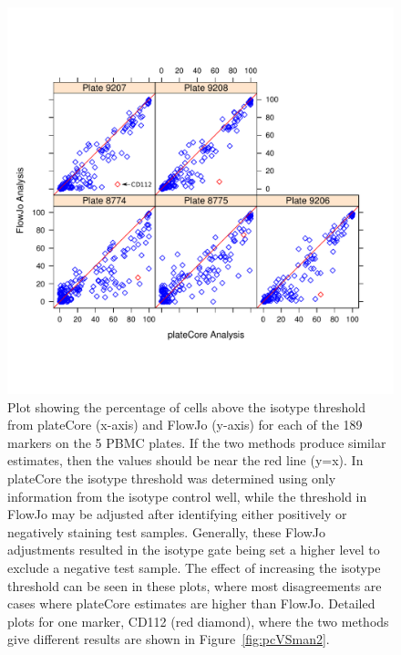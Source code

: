 \documentclass[12pt]{article}
\begin{document}
\begin{figure}
\centering
\includegraphics{fjVSr.pdf}
\caption{Plot showing the percentage of cells above the isotype threshold
from plateCore (x-axis) and FlowJo (y-axis) for each of the 189 markers on
the 5 PBMC plates. If the two methods produce similar estimates, then the
values should be near the red line (y=x). In plateCore the isotype threshold was
determined using only information from the isotype control well, while the
threshold in FlowJo may be adjusted after identifying either positively or
negatively staining test samples. Generally, these FlowJo adjustments resulted
in the isotype gate being set a higher level to exclude a negative test sample. 
The effect of increasing the isotype threshold can be seen in these plots,
where most disagreements are cases where plateCore estimates are higher than
FlowJo. Detailed plots for one marker, CD112 (red diamond), where the two
methods give different results are shown in Figure~\ref{fig:pcVSman2}.
}
\label{fig:pcVSman}
\end{figure}
\end{document}
